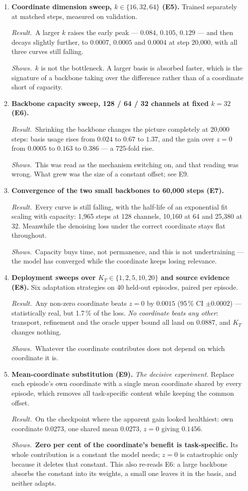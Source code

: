 \documentclass[11pt]{article}
\newcommand{\res}{\par\smallskip\textit{Result.}\ }
\newcommand{\shows}{\par\smallskip\textit{Shows.}\ }
\newcommand{\KT}{K_{T}}
\begin{document}
\begin{enumerate}
\item \textbf{Coordinate dimension sweep, $k \in \{16, 32, 64\}$ (E5).}
Trained separately at matched steps, measured on validation.
\res A larger $k$ raises the early peak --- $0.084$, $0.105$, $0.129$ --- and then decays
slightly further, to $0.0007$, $0.0005$ and $0.0004$ at step 20{,}000, with all three
curves still falling.
\shows $k$ is not the bottleneck. A larger basis is absorbed faster, which is the
signature of a backbone taking over the difference rather than of a coordinate short of
capacity.

\item \textbf{Backbone capacity sweep, 128 / 64 / 32 channels at fixed $k = 32$ (E6).}
\res Shrinking the backbone changes the picture completely at 20{,}000 steps: basis usage
rises from $0.024$ to $0.67$ to $1.37$, and the gain over $z=0$ from $0.0005$ to $0.163$
to $0.386$ --- a 725-fold rise.
\shows \textcolor{overturn}{This was read as the mechanism switching on, and that reading
was wrong.} What grew was the size of a constant offset; see E9.

\item \textbf{Convergence of the two small backbones to 60{,}000 steps (E7).}
\res Every curve is still falling, with the half-life of an exponential fit scaling with
capacity: 1{,}965 steps at 128 channels, 10{,}160 at 64 and 25{,}380 at 32. Meanwhile the
denoising loss under the correct coordinate stays flat throughout.
\shows Capacity buys time, not permanence, and this is not undertraining --- the model has
converged while the coordinate keeps losing relevance.

\item \textbf{Deployment sweeps over $\KT \in \{1,2,5,10,20\}$ and source evidence (E8).}
Six adaptation strategies on 40 held-out episodes, paired per episode.
\res Any non-zero coordinate beats $z = 0$ by $0.0015$ (95\,\% CI $\pm 0.0002$) ---
statistically real, but 1.7\,\% of the loss. \emph{No coordinate beats any other}:
transport, refinement and the oracle upper bound all land on $0.0887$, and $\KT$ changes
nothing.
\shows Whatever the coordinate contributes does not depend on which coordinate it is.

\item \textbf{Mean-coordinate substitution (E9).} \emph{The decisive experiment.}
Replace each episode's own coordinate with a single mean coordinate shared by every
episode, which removes all task-specific content while keeping the common offset.
\res On the checkpoint where the apparent gain looked healthiest: own coordinate
$0.0273$, one shared mean $0.0273$, $z = 0$ giving $0.1456$.
\shows \textbf{Zero per cent of the coordinate's benefit is task-specific.} Its whole
contribution is a constant the model needs; $z = 0$ is catastrophic only because it
deletes that constant. This also re-reads E6: a large backbone absorbs the constant into
its weights, a small one leaves it in the basis, and neither adapts.


\end{enumerate}
\end{document}
